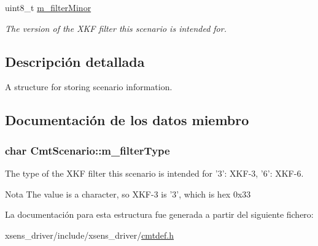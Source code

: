\begin{DoxyCompactItemize}
\item 
\hypertarget{structCmtScenario_a2c17090acd187d81a7b15a9cf5e498af}{uint8\-\_\-t \hyperlink{structCmtScenario_a2c17090acd187d81a7b15a9cf5e498af}{m\-\_\-filter\-Minor}}\label{structCmtScenario_a2c17090acd187d81a7b15a9cf5e498af}

\begin{DoxyCompactList}\small\item\em \-The version of the \-X\-K\-F filter this scenario is intended for. \end{DoxyCompactList}\end{DoxyCompactItemize}


\subsection{\-Descripción detallada}
\-A structure for storing scenario information. 

\subsection{\-Documentación de los datos miembro}
\hypertarget{structCmtScenario_a4b487cecc6f4d44e304c57b5e441f01a}{
\subsubsection[{m\-\_\-filter\-Type}]{\setlength{\rightskip}{0pt plus 5cm}char {\bf \-Cmt\-Scenario\-::m\-\_\-filter\-Type}}}\label{structCmtScenario_a4b487cecc6f4d44e304c57b5e441f01a}


\-The type of the \-X\-K\-F filter this scenario is intended for '3'\-: \-X\-K\-F-\/3, '6'\-: \-X\-K\-F-\/6. 

\begin{DoxyNote}{\-Nota}
\-The value is a character, so \-X\-K\-F-\/3 is '3', which is hex 0x33 
\end{DoxyNote}


\-La documentación para esta estructura fue generada a partir del siguiente fichero\-:\begin{DoxyCompactItemize}
\item 
xsens\-\_\-driver/include/xsens\-\_\-driver/\hyperlink{cmtdef_8h}{cmtdef.\-h}\end{DoxyCompactItemize}
